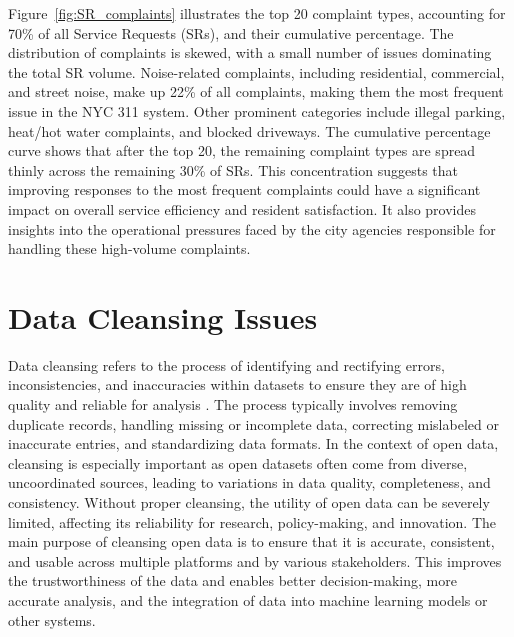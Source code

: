 \documentclass[linenumber]{jdsart}
\begin{document}
Figure~\ref{fig:SR_complaints}
illustrates the top 20 complaint types, accounting for 70\% 
of all Service Requests (SRs), and their cumulative percentage. The 
distribution of complaints is skewed, with a small number of issues 
dominating the total SR volume. Noise-related complaints, including 
residential, commercial, and street noise, make up 22\% of all 
complaints, making them the most frequent issue in the NYC 311 system. 
Other prominent categories include illegal parking, heat/hot water 
complaints, and blocked driveways. The cumulative percentage curve 
shows that after the top 20, the remaining complaint types are spread 
thinly across the remaining 30\% of SRs. This concentration suggests 
that improving responses to the most frequent complaints could have 
a significant impact on overall service efficiency and resident 
satisfaction. It also provides insights into the operational 
pressures faced by the city agencies responsible for handling these 
high-volume complaints.


\section{Data Cleansing Issues} 
\label{sec:issues}

Data cleansing refers to the process of identifying and rectifying
errors, inconsistencies, and inaccuracies within datasets to ensure
they are of high quality and reliable for analysis
\citep{maletic2005data, hosseinzadeh2023data}. The process
typically involves removing duplicate records, handling missing or
incomplete data, correcting mislabeled or inaccurate entries, and
standardizing data formats. In the context of open data, cleansing is
especially important as open datasets often come from diverse,
uncoordinated sources, leading to variations in data quality,
completeness, and consistency. Without proper cleansing, the utility
of open data can be severely limited, affecting its reliability for
research, policy-making, and innovation. The main purpose of cleansing
open data is to ensure that it is accurate, consistent, and usable
across multiple platforms and by various stakeholders. This improves
the trustworthiness of the data and enables better decision-making,
more accurate analysis, and the integration of data into machine
learning models or other systems.



\end{document}
